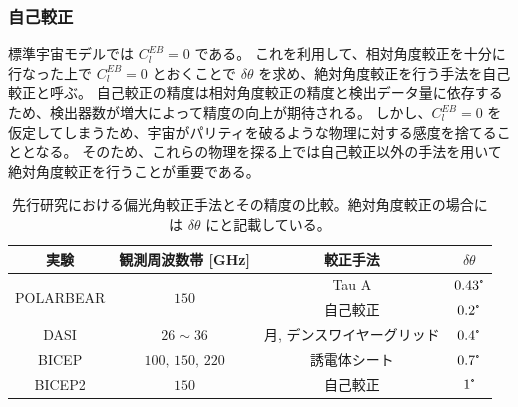 \documentclass[../../main.tex]{subfiles}
\begin{document}
\subsubsection{自己較正}
標準宇宙モデルでは $C_{l}^{EB}=0$ である。
これを利用して、相対角度較正を十分に行なった上で $C_{l}^{EB} = 0$ とおくことで
$\delta\theta$ を求め、絶対角度較正を行う手法を自己較正と呼ぶ。
自己較正の精度は相対角度較正の精度と検出データ量に依存するため、検出器数が増大によって精度の向上が期待される。
しかし、$C_{l}^{EB}=0$ を仮定してしまうため、宇宙がパリティを破るような物理に対する感度を捨てることとなる。
そのため、これらの物理を探る上では自己較正以外の手法を用いて絶対角度較正を行うことが重要である。

\begin{table}[H]
    \centering
    \caption{先行研究における偏光角較正手法とその精度の比較。絶対角度較正の場合には $\delta\theta$ にと記載している。}
    \begin{tabular}{cccc}
        実験 & 観測周波数帯 [GHz] & 較正手法 & $\delta\theta$ \\
        \hline
        \hline
        \multirow{2}{*}{POLARBEAR\cite{so:polarbear_cal}} & \multirow{2}{*}{$150$} & Tau A & $0.43\tcdegree$ \\
                                                          &                        & 自己較正 & $0.2\tcdegree$ \\
        DASI\cite{so:Leitch_2002} & $26\sim36$ & 月, デンスワイヤーグリッド & $0.4\tcdegree$ \\
        BICEP\cite{so:Takahashi_2008} & $100,\,150,\,220$ & 誘電体シート & $0.7\tcdegree$ \\
        BICEP2\cite{so:bicep2_syserr} & $150$ & 自己較正 & $1\tcdegree$ \\
    \end{tabular}
    \label{tab:so-polarization_calibration}
\end{table}
\end{document}
